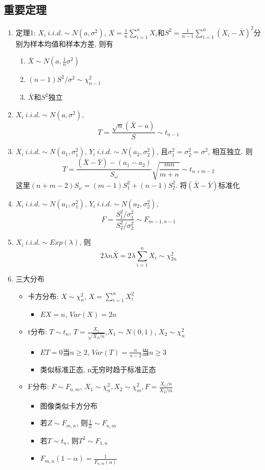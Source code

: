 \documentclass[UTF8]{article}
\begin{document}
\subsection{重要定理}
\begin{enumerate}
\item 定理1: ${X_i}\ i.i.d.\sim N(a, \sigma^2)$, $X=\frac{1}{n}\sum\limits_{i=1}^nX_i$和$S^2=\frac{1}{n-1}\sum\limits_{i=1}^n(X_i-\bar{X})^2$分别为样本均值和样本方差, 则有
	\begin{enumerate}
	\item $\bar{X}\sim N(a,\frac{1}{n}\sigma^2)$
	\item $(n-1)S^2/\sigma^2\sim\chi_{n-1}^2$
	\item $\bar{X}$和$S^2$独立
	\end{enumerate}
\item ${X_i}\ i.i.d.\sim N(a, \sigma^2)$, $$T=\frac{\sqrt{n}(\bar{X}-a)}{S}\sim t_{n-1}$$
\item ${X_i}\ i.i.d.\sim N(a_1, \sigma_1^2)$, ${Y_i}\ i.i.d.\sim N(a_2, \sigma_2^2)$, 且$\sigma_1^2=\sigma_2^2=\sigma^2$, 相互独立. 则
$$T=\frac{(\bar{X}-\bar{Y})-(a_1-a_2)}{S_\omega}\sqrt{\frac{mn}{m+n}}\sim t_{n+m-2}$$
这里$(n+m-2)S_\omega=(m-1)S_1^2+(n-1)S_2^2$. 将$(\bar{X}-\bar{Y})$标准化
\item ${X_i}\ i.i.d.\sim N(a_1, \sigma_1^2)$, ${Y_i}\ i.i.d.\sim N(a_2, \sigma_2^2)$,$$F=\frac{S_1^2/\sigma_1^2}{S_2^2/\sigma_2^2}\sim F_{m-1,n-1}$$
\item  ${X_i}\ i.i.d.\sim Exp(\lambda)$, 则$$2\lambda n\bar{X}=2\lambda\sum\limits_{i=1}^nX_i\sim\chi_{2n}^2$$
\item 三大分布
	\begin{itemize}
	\item 卡方分布: $X\sim\chi_n^2$, $X=\sum\limits_{i=1}^nX_i^2$
		\begin{itemize}
		\item $EX=n$, $Var(X)=2n$
		\end{itemize}
	\item t分布: $T\sim t_n$, $T=\frac{X_1}{\sqrt{X_2/n}}$,$X_1\sim N(0,1)$, $X_2\sim\chi_n^2$
		\begin{itemize}
		\item $ET=0$当$n\ge2$, $Var(T)=\frac{n}{n-2}$当$n\ge3$
		\item 类似标准正态, n无穷时趋于标准正态
		\end{itemize}
	\item F分布: $F\sim F_{n,m}$, $X_1\sim\chi_n^2,X_2\sim\chi_m^2, F=\frac{X_1/n}{X_2/m}$
		\begin{itemize}
		\item 图像类似卡方分布
		\item 若$Z\sim F_{m,n}$, 则$\frac{1}{Z}\sim F_{n, m}$
		\item 若$T\sim t_n$, 则$T^2\sim F_{1,n}$
		\item $F_{m,n}(1-\alpha)=\frac{1}{F_{n,m}(\alpha)}$
		\end{itemize}
	\end{itemize}
\end{enumerate}
\end{document}
